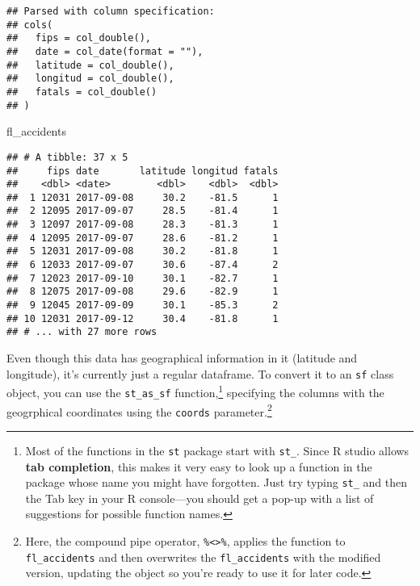 \documentclass[]{tufte-book}
\newenvironment{Shaded}{}{}
\newcommand{\DataTypeTok}[1]{\textcolor[rgb]{0.56,0.13,0.00}{#1}}
\newcommand{\KeywordTok}[1]{\textcolor[rgb]{0.00,0.44,0.13}{\textbf{#1}}}
\newcommand{\NormalTok}[1]{#1}
\newcommand{\OperatorTok}[1]{\textcolor[rgb]{0.40,0.40,0.40}{#1}}
\newcommand{\StringTok}[1]{\textcolor[rgb]{0.25,0.44,0.63}{#1}}
\begin{document}
\begin{verbatim}
## Parsed with column specification:
## cols(
##   fips = col_double(),
##   date = col_date(format = ""),
##   latitude = col_double(),
##   longitud = col_double(),
##   fatals = col_double()
## )
\end{verbatim}

\begin{Shaded}
\begin{Highlighting}[]
\NormalTok{fl_accidents}
\end{Highlighting}
\end{Shaded}

\begin{verbatim}
## # A tibble: 37 x 5
##     fips date       latitude longitud fatals
##    <dbl> <date>        <dbl>    <dbl>  <dbl>
##  1 12031 2017-09-08     30.2    -81.5      1
##  2 12095 2017-09-07     28.5    -81.4      1
##  3 12097 2017-09-08     28.3    -81.3      1
##  4 12095 2017-09-07     28.6    -81.2      1
##  5 12031 2017-09-08     30.2    -81.8      1
##  6 12033 2017-09-07     30.6    -87.4      2
##  7 12023 2017-09-10     30.1    -82.7      1
##  8 12075 2017-09-08     29.6    -82.9      1
##  9 12045 2017-09-09     30.1    -85.3      2
## 10 12031 2017-09-12     30.4    -81.8      1
## # ... with 27 more rows
\end{verbatim}

Even though this data has geographical information in it (latitude and longitude), it's currently
just a regular dataframe. To convert it to an \texttt{sf} class object, you can use the \texttt{st\_as\_sf} function,\footnote{Most of the functions in the \texttt{st} package start with \texttt{st\_}. Since R studio allows \textbf{tab completion},
  this makes it very easy to look up a function in the package whose name you might have forgotten.
  Just try typing \texttt{st\_} and then the Tab key in your R console---you should get a pop-up with a list of
  suggestions for possible function names.}
specifying the columns with the geogrphical coordinates using the \texttt{coords} parameter.\footnote{Here, the
  compound pipe operator, \texttt{\%\textless{}\textgreater{}\%}, applies the function to \texttt{fl\_accidents} and then overwrites the
  \texttt{fl\_accidents} with the modified version, updating the object so you're ready to use it for later
  code.}

\begin{Shaded}
\end{Shaded}
\end{document}
